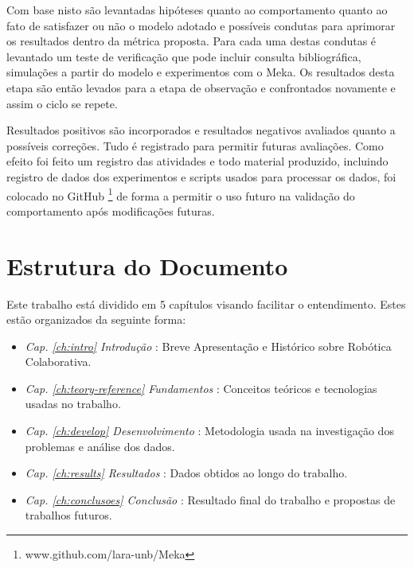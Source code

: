 Com base nisto são levantadas hipóteses quanto ao comportamento quanto ao fato de satisfazer ou não o modelo adotado e possíveis condutas para aprimorar os resultados dentro da métrica proposta. Para cada uma destas condutas é levantado um teste de verificação que pode incluir consulta bibliográfica, simulações a partir do modelo e experimentos com o Meka. Os resultados desta etapa são então levados para a etapa de observação e confrontados novamente e assim o ciclo se repete.

Resultados positivos são incorporados e resultados negativos avaliados quanto a possíveis correções. Tudo é registrado para permitir futuras avaliações. Como efeito foi feito um registro das atividades e todo material produzido, incluindo registro de dados dos experimentos e scripts usados para processar os dados, foi colocado no GitHub \footnote{www.github.com/lara-unb/Meka} de forma a permitir o uso futuro na validação do comportamento após modificações futuras.

\section{Estrutura do Documento}

Este trabalho está dividido em 5 capítulos visando facilitar o entendimento. Estes estão organizados da seguinte forma:

\begin{itemize}
    \item \textit{Cap. \ref{ch:intro} Introdução} : Breve Apresentação e Histórico sobre Robótica Colaborativa.
    \item \textit{Cap. \ref{ch:teory-reference} Fundamentos} : Conceitos teóricos e tecnologias usadas no trabalho.
    \item \textit{Cap. \ref{ch:develop} Desenvolvimento} : Metodologia usada na investigação dos problemas e análise dos dados.
    \item \textit{Cap. \ref{ch:results} Resultados} : Dados obtidos ao longo do trabalho.
    \item \textit{Cap. \ref{ch:conclusoes} Conclusão} : Resultado final do trabalho e propostas de trabalhos futuros.
\end{itemize}
